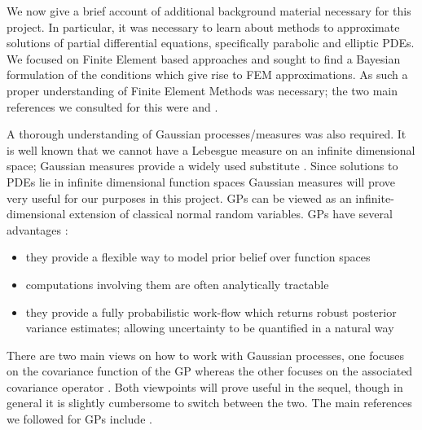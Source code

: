 We now give a brief account of additional background material necessary for this project. In particular, it was necessary to learn about methods to approximate solutions of partial differential equations, specifically parabolic and elliptic PDEs. We focused on Finite Element based approaches and sought to find a Bayesian formulation of the conditions which give rise to FEM approximations. As such a proper understanding of Finite Element Methods was necessary; the two main references we consulted for this were \textcolor{blue}{\citep{lord2014introduction}} and \textcolor{blue}{\citep{larsson2008partial}}.

A thorough understanding of Gaussian processes/measures was also required. It is well known that we cannot have a Lebesgue measure on an infinite dimensional space; Gaussian measures provide a widely used substitute \textcolor{blue}{\citep{da2006introduction}}. Since solutions to PDEs lie in infinite dimensional function spaces Gaussian measures will prove very useful for our purposes in this project. GPs can be viewed as an infinite-dimensional extension of classical normal random variables. GPs have several advantages \textcolor{blue}{\citep{raissi2017machine}}:
\begin{itemize}
    \item they provide a flexible way to model prior belief over function spaces
    \item computations involving them are often analytically tractable
    \item they provide a fully probabilistic work-flow which returns robust posterior variance estimates; allowing uncertainty to be quantified in a natural way
\end{itemize}
There are two main views on how to work with Gaussian processes, one focuses on the covariance function of the GP \textcolor{blue}{\citep{Rasmussen06gaussianprocesses}} whereas the other focuses on the associated covariance operator \textcolor{blue}{\citep{da2006introduction,lifshits2012lectures,lunardi2015infinite}}. Both viewpoints will prove useful in the sequel, though in general it is slightly cumbersome to switch between the two. The main references we followed for GPs include \textcolor{blue}{\citep{da2006introduction,Rasmussen06gaussianprocesses,lifshits2012lectures,lunardi2015infinite}}.

